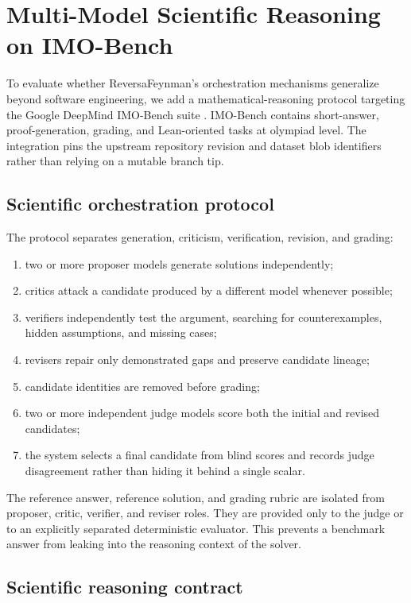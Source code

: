 \section{Multi-Model Scientific Reasoning on IMO-Bench}

To evaluate whether ReversaFeynman's orchestration mechanisms generalize beyond software engineering, we add a mathematical-reasoning protocol targeting the Google DeepMind IMO-Bench suite \cite{luong2025robustmath}. IMO-Bench contains short-answer, proof-generation, grading, and Lean-oriented tasks at olympiad level. The integration pins the upstream repository revision and dataset blob identifiers rather than relying on a mutable branch tip.

\subsection{Scientific orchestration protocol}

The protocol separates generation, criticism, verification, revision, and grading:

\begin{enumerate}
  \item two or more proposer models generate solutions independently;
  \item critics attack a candidate produced by a different model whenever possible;
  \item verifiers independently test the argument, searching for counterexamples, hidden assumptions, and missing cases;
  \item revisers repair only demonstrated gaps and preserve candidate lineage;
  \item candidate identities are removed before grading;
  \item two or more independent judge models score both the initial and revised candidates;
  \item the system selects a final candidate from blind scores and records judge disagreement rather than hiding it behind a single scalar.
\end{enumerate}

The reference answer, reference solution, and grading rubric are isolated from proposer, critic, verifier, and reviser roles. They are provided only to the judge or to an explicitly separated deterministic evaluator. This prevents a benchmark answer from leaking into the reasoning context of the solver.

\subsection{Scientific reasoning contract}

